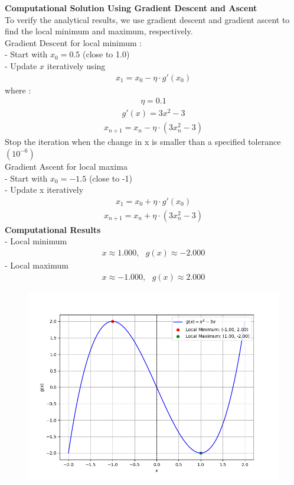 \documentclass[journal]{IEEEtran}
\begin{document}
\textbf{Computational Solution Using Gradient Descent and Ascent}\\
To verify the analytical results, we use gradient descent and gradient ascent to find the local minimum and maximum, respectively.\\
Gradient Descent for local minimum : \\ 
 - Start with $x_0 = 0.5$ (close to 1.0)\\
 - Update $x$ iteratively using 
\begin{align}
    x_{1} = x_0 - \eta \cdot g'(x_0)
\end{align}
where :
\begin{align}
    \eta = 0.1 
\end{align}
\begin{align}
    g'(x) = 3x^2 - 3 
\end{align}
\begin{align}
    x_{n+1} = x_n - \eta \cdot (3x_n^2 -3)
\end{align}
Stop the iteration when the change in x is smaller than a specified tolerance $(10^{-6})$\\
Gradient Ascent for local maxima \\
- Start with $x_0 = - 1.5$ (close to -1)\\
- Update x iteratively 
\begin{align}
  x_1 = x_0 + \eta \cdot g'(x_0)
\end{align}
\begin{align}
    x_{n+1} = x_n + \eta\cdot(3x_n^2-3)
\end{align}
\textbf{Computational Results} \\
 - Local minimum 
 \begin{align}
     x \approx 1.000,\text{ } g(x) \approx -2.000
 \end{align} 
- Local maximum
\begin{align}
    x \approx -1.000 , \text{ }g(x)  \approx 2.000
\end{align}
\begin{figure}
    \centering
    \includegraphics[width=\columnwidth]{figs/Figure_1.png}
\end{figure}
\end{document}
